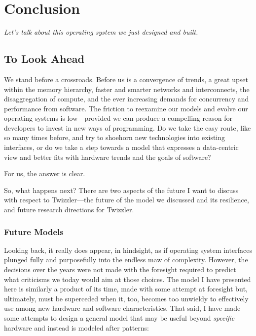 
\chapter{Conclusion}\label{ch:conclusion}


\emph{Let's talk about this operating system we just designed and built.}

\section{To Look Ahead}



We stand before a crossroads. Before us is a convergence of trends, a great upset within the memory hierarchy, faster
and smarter networks and interconnects, the disaggregation of compute, and the
ever increasing demands for concurrency and performance from software. The friction to reexamine our models and evolve
our operating systems is low---provided we can produce a compelling reason for developers to invest in new ways of programming.
Do we take the easy route, like so many times before, and try to shoehorn new technologies into existing interfaces, or
do we take a step towards a model that expresses a data-centric view and better fits with hardware trends and the goals
of software?

\vspace{5mm}
\noindent For us, the answer is clear.
\vspace{5mm}

So, what happens next? There are two aspects of the future I want to discuss with respect to Twizzler---the future of
the model we discussed and its resilience, and future research directions for Twizzler.

\subsection{Future Models}

Looking back, it really does appear, in hindsight, as if operating system interfaces plunged fully and purposefully into the endless maw of
complexity. However, the decisions over the years were not made with the foresight required to predict what criticisms
we today would aim at those choices. The model I have presented here is similarly a product of its time, made with
some attempt at foresight but, ultimately, must be superceded when it, too, becomes too unwieldy to effectively use
among new hardware and software characteristics. That said, I have made some attempts to design a general model that
may be useful beyond \emph{specific} hardware and instead is modeled after patterns:

